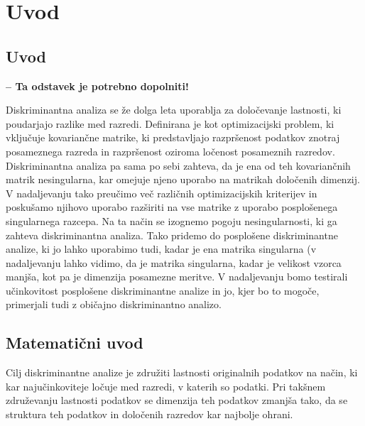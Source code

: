 \documentclass[mat1]{article}
\theoremstyle{definition}
\begin{document}
\section{Uvod}

\subsection{Uvod}

\textbf{-- Ta odstavek je potrebno dopolniti!}

Diskriminantna analiza se že dolga leta uporablja za določevanje lastnosti, ki poudarjajo razlike med razredi. Definirana je kot optimizacijski problem, ki vključuje kovariančne matrike, ki predstavljajo razpršenost podatkov znotraj posameznega razreda in razpršenost oziroma ločenost posameznih razredov. Diskriminantna analiza pa sama po sebi zahteva, da je ena od teh kovariančnih matrik nesingularna, kar omejuje njeno uporabo na matrikah določenih dimenzij. V nadaljevanju tako preučimo več različnih optimizacijskih kriterijev in poskušamo njihovo uporabo razširiti na vse matrike z uporabo posplošenega singularnega razcepa. Na ta način se izognemo pogoju nesingularnosti, ki ga zahteva diskriminantna analiza. Tako pridemo do posplošene diskriminantne analize, ki jo lahko uporabimo tudi, kadar je ena matrika singularna (v nadaljevanju lahko vidimo, da je matrika singularna, kadar je velikost vzorca manjša, kot pa je dimenzija posamezne meritve. V nadaljevanju bomo testirali učinkovitost posplošene diskriminantne analize in jo, kjer bo to mogoče, primerjali tudi z običajno diskriminantno analizo.

\subsection{Matematični uvod}

Cilj diskriminantne analize je združiti lastnosti originalnih podatkov na način, ki kar najučinkoviteje ločuje med razredi, v katerih so podatki. Pri takšnem združevanju lastnosti podatkov se dimenzija teh podatkov zmanjša tako, da se struktura teh podatkov in določenih razredov kar najbolje ohrani.
\end{document}
